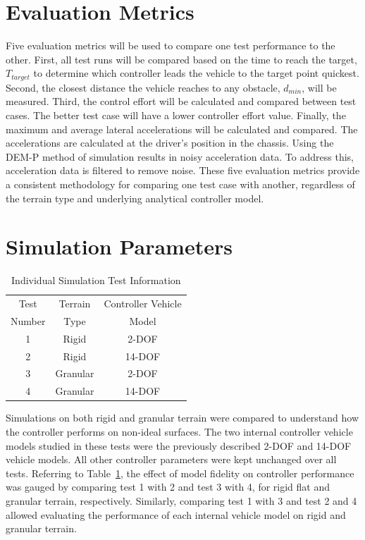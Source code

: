\documentclass[12pt,onecolumn]{report}
\begin{document}
\section{Evaluation Metrics}\label{s:Metrics}
Five evaluation metrics will be used to compare one test performance to the other. First, all test runs will be compared based on the time to reach the target, $T_{target}$ to determine which controller leads the vehicle to the target point quickest. Second, the closest distance the vehicle reaches to any obstacle, $d_{min}$, will be measured. Third, the control effort will be calculated and compared between test cases. The better test case will have a lower controller effort value. Finally, the maximum and average lateral accelerations will be calculated and compared. The accelerations are calculated at the driver's position in the chassis. Using the DEM-P method of simulation results in noisy acceleration data. To address this, acceleration data is filtered to remove noise. These five evaluation metrics provide a consistent methodology for comparing one test case with another, regardless of the terrain type and underlying analytical controller model.


\section{Simulation Parameters}\label{s:SimParameters}

\begin{table}
\begin{center}
	\begin{tabular}{||c |c | c||} 
		\hline
		Test  & Terrain  & Controller Vehicle \\
		Number &  Type & Model\\ [0.5ex] 	
		\hline\hline
		1 & Rigid & 2-DOF \\ 
		\hline
		2 & Rigid & 14-DOF \\
		\hline
		3 & Granular & 2-DOF \\
		\hline
		4 & Granular & 14-DOF \\
		\hline
	\end{tabular}
\end{center}
\caption{Individual Simulation Test Information}
\label{t:TestMatrix}
\end{table}

Simulations on both rigid and granular terrain were compared to understand how the controller performs on non-ideal surfaces.  The two internal controller vehicle models studied in these tests were the previously described 2-DOF and 14-DOF vehicle models. All other controller parameters were kept unchanged over all tests. Referring to Table~\ref{t:TestMatrix}, the effect of model fidelity on controller performance was gauged by comparing test 1 with 2 and test 3 with 4, for rigid flat and granular terrain, respectively.
Similarly, comparing test 1 with 3 and test 2 and 4 allowed evaluating the performance of each internal vehicle model on rigid and granular terrain.
\end{document}
